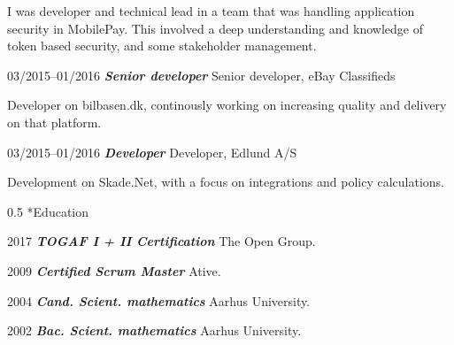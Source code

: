 \documentclass[10pt,a4,sans]{article}
\makeatletter
\renewcommand{\section}{\@startsection{section}{12}
{0mm} 
{0.8\baselineskip} %
{0.5\baselineskip} %
{\Large\scshape
\vspace{0.5\baselineskip}
}}
\makeatother
\begin{document}
\begin{CV}
I was developer and technical lead in a team that was handling application security in MobilePay. This involved a deep understanding and knowledge of token based security, and some stakeholder management.

    \item[03/2015--01/2016] \textbf{\emph{Senior developer}} Senior developer, eBay Classifieds 
    
    Developer on bilbasen.dk, continously working on increasing quality and delivery on that platform.

    \item[03/2015--01/2016] \textbf{\emph{Developer}} Developer, Edlund A/S 
    
    Development on Skade.Net, with a focus on integrations and policy calculations.
    
\end{CV}

\section*{Education}

\begin{CV}
    \item[2017] \textbf{\emph{TOGAF I + II Certification}} The Open Group.
    \item[2009] \textbf{\emph{Certified Scrum Master}} Ative.
    \item[2004] \textbf{\emph{Cand. Scient. mathematics}} Aarhus University.
    \item[2002] \textbf{\emph{Bac. Scient. mathematics}} Aarhus University.
\end{CV}
\end{document}
